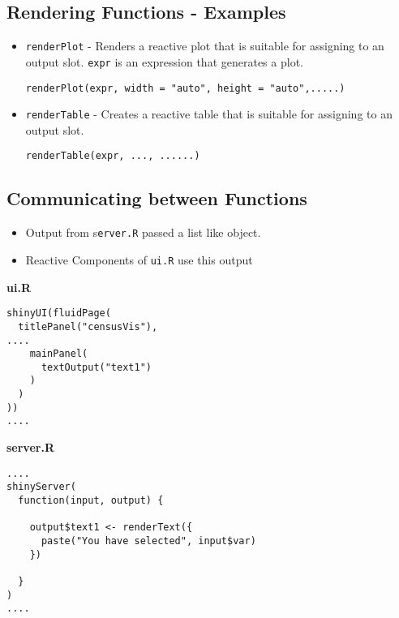 \documentclass[a4paper,12pt]{article}
\begin{document}
\subsection*{Rendering Functions - Examples}
\begin{itemize}
\item \texttt{renderPlot} - Renders a reactive plot that is suitable for assigning to an output slot. 
\texttt{expr} is an expression that generates a plot.

\begin{framed}
\begin{verbatim}
renderPlot(expr, width = "auto", height = "auto",.....)
\end{verbatim}
\end{framed}


\item \texttt{renderTable} - Creates a reactive table that is suitable for assigning to an output slot.


\begin{framed}
\begin{verbatim}
renderTable(expr, ..., ......)
\end{verbatim}
\end{framed}

\end{itemize}

\newpage
\subsection*{Communicating between Functions}
\begin{itemize}
\item Output from s\texttt{erver.R} passed a list like object.
\item Reactive Components of \texttt{ui.R} use this output
\end{itemize}


\textbf{ui.R}
\begin{framed}
\begin{verbatim}
shinyUI(fluidPage(
  titlePanel("censusVis"),
....
    mainPanel(
      textOutput("text1")
    )
  )
))
....
\end{verbatim}
\end{framed}
\textbf{server.R}
\begin{framed}
\begin{verbatim}
....
shinyServer(
  function(input, output) {
  
    output$text1 <- renderText({ 
      paste("You have selected", input$var)
    })
    
  }
)
....
\end{verbatim}
\end{framed}
\end{document}
